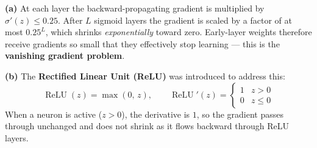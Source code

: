 \documentclass[11pt, a4paper]{article}
\begin{document}
\begin{tcolorbox}[solutionbox]
\textbf{(a)} At each layer the backward-propagating gradient is multiplied by
$\sigma'(z) \leq 0.25$. After $L$ sigmoid layers the gradient is scaled by a
factor of at most $0.25^L$, which shrinks \emph{exponentially} toward zero.
Early-layer weights therefore receive gradients so small that they effectively
stop learning — this is the \textbf{vanishing gradient problem}.

\medskip
\textbf{(b)} The \textbf{Rectified Linear Unit (ReLU)} was introduced to address this:
\[
  \operatorname{ReLU}(z) = \max(0,\, z),
  \qquad
  \operatorname{ReLU}'(z) =
  \begin{cases} 1 & z > 0 \\ 0 & z \leq 0 \end{cases}
\]
When a neuron is active ($z > 0$), the derivative is $1$, so the gradient passes
through unchanged and does not shrink as it flows backward through ReLU layers.
\end{tcolorbox}
\end{document}
